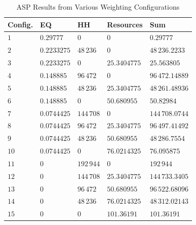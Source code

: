 \documentclass[final,journal,10pt,letterpaper,oneside,twocolumn,compsoc]%
{IEEEtran}
\begin{document}
\begin{table}[t!]
  \caption{ASP Results from Various Weighting Configurations}
  \label{tab:13}
  \centering
    \begin{tabular}{| l | l | l | l | l |}
      \hline
      Config. & EQ & HH& Resources & Sum \\
      \hline
      $1$           & $0.29777$   & $0$      & $0$          & $0.29777$ \\
      $2$           & $0.2233275$ & $48\,236$  & $0$          & $48\,236.2233$ \\
      $3$           & $0.2233275$ & $0$      & $25.3404775$ & $25.563805$ \\
      $4$           & $0.148885$  & $96\,472$  & $0$          & $96\,472.14889$ \\
      $5$           & $0.148885$  & $48\,236$  & $25.3404775$ & $48\,261.48936$ \\
      $6$           & $0.148885$  & $0$      & $50.680955$  & $50.82984$ \\
      $7$           & $0.0744425$ & $144\,708$ & $0$          & $144\,708.0744$ \\
      $8$           & $0.0744425$ & $96\,472$  & $25.3404775$ & $96\,497.41492$ \\
      $9$           & $0.0744425$ & $48\,236$  & $50.680955$  & $48\,286.7554$ \\
      $10$          & $0.0744425$ & $0$      & $76.0214325$ & $76.095875$ \\
      $11$          & $0$         & $192\,944$ & $0$          & $192\,944$ \\
      $12$          & $0$         & $144\,708$ & $25.3404775$ & $144\,733.3405$ \\
      $13$          & $0$         & $96\,472$  & $50.680955$  & $96\,522.68096$ \\
      $14$          & $0$         & $48\,236$  & $76.0214325$ & $48\,312.02143$ \\
      $15$          & $0$         & $0$      & $101.36191$  & $101.36191$ \\
      \hline
    \end{tabular}
\end{table}
\end{document}
